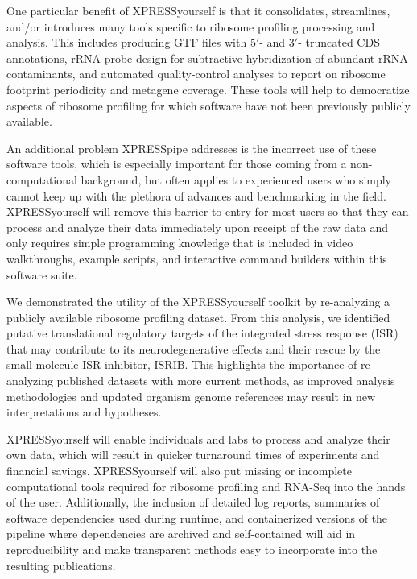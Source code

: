 \documentclass[10pt, oneside]{article}
\begin{document}
One particular benefit of XPRESSyourself is that it consolidates, streamlines, and/or introduces many tools specific to ribosome profiling processing and analysis. This includes producing GTF files with $5'$- and $3'$- truncated CDS annotations, rRNA probe design for subtractive hybridization of abundant rRNA contaminants, and automated quality-control analyses to report on ribosome footprint periodicity and metagene coverage. These tools will help to democratize aspects of ribosome profiling for which software have not been previously publicly available. \par

An additional problem XPRESSpipe addresses is the incorrect use of these software tools, which is especially important for those coming from a non-computational background, but often applies to experienced users who simply cannot keep up with the plethora of advances and benchmarking in the field. XPRESSyourself will remove this barrier-to-entry for most users so that they can process and analyze their data immediately upon receipt of the raw data and only requires simple programming knowledge that is included in video walkthroughs, example scripts, and interactive command builders within this software suite. \par

We demonstrated the utility of the XPRESSyourself toolkit by re-analyzing a publicly available ribosome profiling dataset. From this analysis, we identified putative translational regulatory targets of the integrated stress response (ISR) that may contribute to its neurodegenerative effects and their rescue by the small-molecule ISR inhibitor, ISRIB. This highlights the importance of re-analyzing published datasets with more current methods, as improved analysis methodologies and updated organism genome references may result in new interpretations and hypotheses. \par

XPRESSyourself will enable individuals and labs to process and analyze their own data, which will result in quicker turnaround times of experiments and financial savings. XPRESSyourself will also put missing or incomplete computational tools required for ribosome profiling and RNA-Seq into the hands of the user. Additionally, the inclusion of detailed log reports, summaries of software dependencies used during runtime, and containerized versions of the pipeline where dependencies are archived and self-contained will aid in reproducibility and make transparent methods easy to incorporate into the resulting publications. \par
\end{document}
